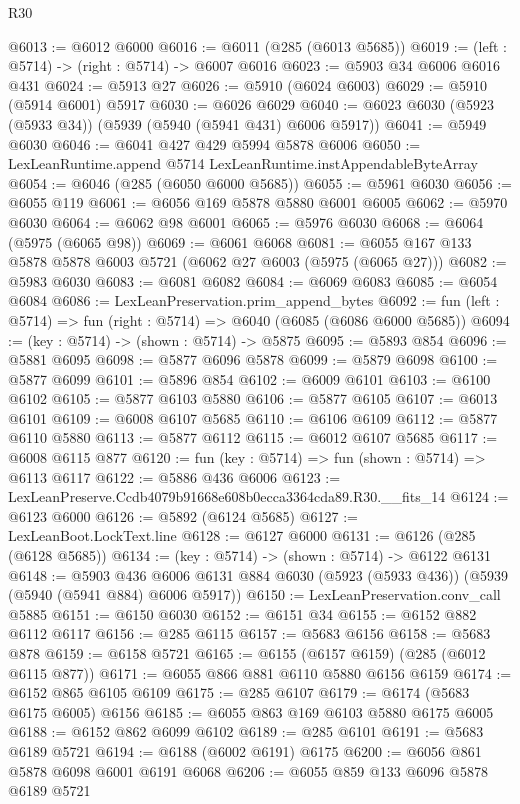 \begin{lexlean}{R30}
\begin{coremodule}
@6013 := @6012 @6000
@6016 := @6011 (@285 (@6013 @5685))
@6019 := (left : @5714) -> (right : @5714) -> @6007 @6016
@6023 := @5903 @34 @6006 @6016 @431
@6024 := @5913 @27
@6026 := @5910 (@6024 @6003)
@6029 := @5910 (@5914 @6001) @5917
@6030 := @6026 @6029
@6040 := @6023 @6030 (@5923 (@5933 @34)) (@5939 (@5940 (@5941 @431) @6006 @5917))
@6041 := @5949 @6030
@6046 := @6041 @427 @429 @5994 @5878 @6006
@6050 := LexLeanRuntime.append @5714 LexLeanRuntime.instAppendableByteArray
@6054 := @6046 (@285 (@6050 @6000 @5685))
@6055 := @5961 @6030
@6056 := @6055 @119
@6061 := @6056 @169 @5878 @5880 @6001 @6005
@6062 := @5970 @6030
@6064 := @6062 @98 @6001
@6065 := @5976 @6030
@6068 := @6064 (@5975 (@6065 @98))
@6069 := @6061 @6068
@6081 := @6055 @167 @133 @5878 @5878 @6003 @5721 (@6062 @27 @6003 (@5975 (@6065 @27)))
@6082 := @5983 @6030
@6083 := @6081 @6082
@6084 := @6069 @6083
@6085 := @6054 @6084
@6086 := LexLeanPreservation.prim_append_bytes
@6092 := fun (left : @5714) => fun (right : @5714) => @6040 (@6085 (@6086 @6000 @5685))
@6094 := (key : @5714) -> (shown : @5714) -> @5875
@6095 := @5893 @854
@6096 := @5881 @6095
@6098 := @5877 @6096 @5878
@6099 := @5879 @6098
@6100 := @5877 @6099
@6101 := @5896 @854
@6102 := @6009 @6101
@6103 := @6100 @6102
@6105 := @5877 @6103 @5880
@6106 := @5877 @6105
@6107 := @6013 @6101
@6109 := @6008 @6107 @5685
@6110 := @6106 @6109
@6112 := @5877 @6110 @5880
@6113 := @5877 @6112
@6115 := @6012 @6107 @5685
@6117 := @6008 @6115 @877
@6120 := fun (key : @5714) => fun (shown : @5714) => @6113 @6117
@6122 := @5886 @436 @6006
@6123 := LexLeanPreserve.Ccdb4079b91668e608b0ecca3364cda89.R30.__fits_14
@6124 := @6123 @6000
@6126 := @5892 (@6124 @5685)
@6127 := LexLeanBoot.LockText.line
@6128 := @6127 @6000
@6131 := @6126 (@285 (@6128 @5685))
@6134 := (key : @5714) -> (shown : @5714) -> @6122 @6131
@6148 := @5903
    @436
    @6006
    @6131
    @884
    @6030
    (@5923 (@5933 @436))
    (@5939 (@5940 (@5941 @884) @6006 @5917))
@6150 := LexLeanPreservation.conv_call @5885
@6151 := @6150 @6030
@6152 := @6151 @34
@6155 := @6152 @882 @6112 @6117
@6156 := @285 @6115
@6157 := @5683 @6156
@6158 := @5683 @878
@6159 := @6158 @5721
@6165 := @6155 (@6157 @6159) (@285 (@6012 @6115 @877))
@6171 := @6055 @866 @881 @6110 @5880 @6156 @6159
@6174 := @6152 @865 @6105 @6109
@6175 := @285 @6107
@6179 := @6174 (@5683 @6175 @6005) @6156
@6185 := @6055 @863 @169 @6103 @5880 @6175 @6005
@6188 := @6152 @862 @6099 @6102
@6189 := @285 @6101
@6191 := @5683 @6189 @5721
@6194 := @6188 (@6002 @6191) @6175
@6200 := @6056 @861 @5878 @6098 @6001 @6191 @6068
@6206 := @6055 @859 @133 @6096 @5878 @6189 @5721

\end{coremodule}
\end{lexlean}
